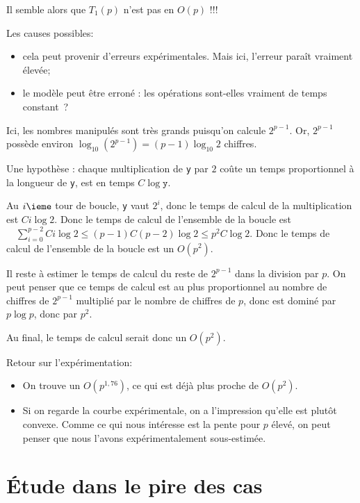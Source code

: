 Il semble alors que $T_1(p)$ n'est pas en $O(p)$ !!!

Les causes possibles:
\begin{itemize}
\item cela peut provenir d'erreurs expérimentales. Mais ici, l'erreur paraît vraiment 
élevée;
\item le modèle peut être erroné : les opérations sont-elles vraiment de temps constant~?
\end{itemize}




Ici, les nombres manipulés sont très grands puisqu'on calcule
$2^{p-1}$. Or, $2^{p-1}$ possède environ $\log_{10} (2^{p-1}) =
(p-1)\log_{10} 2$ chiffres.

Une hypothèse : chaque multiplication de \lstinline{y} par $2$ coûte un temps proportionnel à la longueur de \lstinline{y}, est en temps $C \log \texttt{y}$.

Au $i\ieme$ tour de boucle, \lstinline{y} vaut $2^{i}$, donc le temps de
calcul de la multiplication est $C i \log 2$. Donc le temps de calcul
de l'ensemble de la boucle est $\quad   \sum_{i=0}^{p-2} C i \log 2 \leq (p-1) C (p-2)\log 2\leq p^{2}C\log 2$.
Donc le temps de calcul de l'ensemble de la boucle est un $O(p^{2})$.

Il reste à estimer le temps de calcul du reste de $2^{p-1}$ dans la
division par $p$. On peut penser que ce temps de calcul est au plus
proportionnel au nombre de chiffres de $2^{p-1}$ multiplié par le
nombre de chiffres de $p$, donc est dominé par $p\log p$, donc par
$p^{2}$.

Au final, le temps de calcul serait donc un $O(p^{2})$.

Retour sur l'expérimentation:
\begin{itemize}
\item On trouve un $O(p^{1,76})$, ce qui est déjà plus proche de $O(p^{2})$.
\item Si on regarde la courbe expérimentale, on a l'impression qu'elle
  est plutôt convexe. Comme ce qui nous intéresse est la pente pour
  $p$ élevé, on peut penser que nous l'avons expérimentalement sous-estimée.
\end{itemize}

\section{\'Etude dans le pire des cas}

